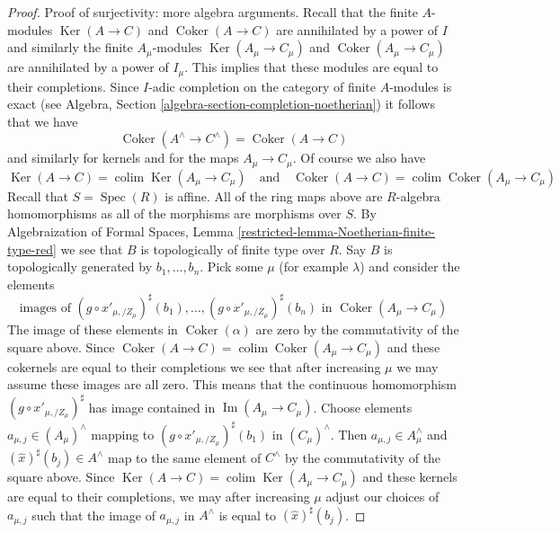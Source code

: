 \documentclass{stacks-project}
\theoremstyle{plain}
\theoremstyle{definition}
\theoremstyle{remark}
\numberwithin{equation}{subsection}
\def\colim{\mathop{\mathrm{colim}}\nolimits}
\def\Spec{\mathop{\mathrm{Spec}}}
\def\Ker{\mathop{\mathrm{Ker}}}
\def\Im{\mathop{\mathrm{Im}}}
\def\Coker{\mathop{\mathrm{Coker}}}
\begin{document}
\begin{proof}
\medskip\noindent
Proof of surjectivity: more algebra arguments. Recall that the finite
$A$-modules $\Ker(A \to C)$ and $\Coker(A \to C)$ are annihilated
by a power of $I$ and similarly the finite $A_\mu$-modules
$\Ker(A_\mu \to C_\mu)$ and $\Coker(A_\mu \to C_\mu)$ are annihilated
by a power of $I_\mu$. This implies that these modules are
equal to their completions. Since $I$-adic completion on the category of
finite $A$-modules is exact (see
Algebra, Section \ref{algebra-section-completion-noetherian})
it follows that we have
$$
\Coker(A^\wedge \to C^\wedge) = \Coker(A \to C)
$$
and similarly for kernels and for the maps $A_\mu \to C_\mu$.
Of course we also have
$$
\Ker(A \to C) = \colim \Ker(A_\mu \to C_\mu)
\quad\text{and}\quad
\Coker(A \to C) = \colim \Coker(A_\mu \to C_\mu)
$$
Recall that $S = \Spec(R)$ is affine. All of the ring maps
above are $R$-algebra homomorphisms as all of the morphisms
are morphisms over $S$. By
Algebraization of Formal Spaces, Lemma
\ref{restricted-lemma-Noetherian-finite-type-red}
we see that $B$ is topologically of finite type over $R$.
Say $B$ is topologically generated by $b_1, \ldots, b_n$.
Pick some $\mu$ (for example $\lambda$) and consider
the elements
$$
\text{images of }
(g \circ x'_{\mu, /Z_\mu})^\sharp(b_1)
, \ldots,
(g \circ x'_{\mu, /Z_\mu})^\sharp(b_n)
\text{ in }\Coker(A_\mu \to C_\mu)
$$
The image of these elements in $\Coker(\alpha)$ are zero
by the commutativity of the square above. Since
$\Coker(A \to C) = \colim \Coker(A_\mu \to C_\mu)$ and these
cokernels are equal to their completions
we see that after increasing $\mu$ we may assume these
images are all zero. This means that the continuous
homomorphism $(g \circ x'_{\mu, /Z_\mu})^\sharp$ has image contained
in $\Im(A_\mu \to C_\mu)$.
Choose elements $a_{\mu, j} \in (A_\mu)^\wedge$ mapping to
$(g \circ x'_{\mu, /Z_\mu})^\sharp(b_1)$ in $(C_\mu)^\wedge$.
Then $a_{\mu, j} \in A_\mu^\wedge$ and $(\hat x)^\sharp(b_j) \in A^\wedge$
map to the same element of $C^\wedge$ by the commutativity of the
square above. Since
$\Ker(A \to C) = \colim \Ker(A_\mu \to C_\mu)$ and these kernels
are equal to their completions, we may after increasing
$\mu$ adjust our choices of $a_{\mu, j}$ such that
the image of $a_{\mu, j}$ in $A^\wedge$ is equal to $(\hat x)^\sharp(b_j)$.


\end{proof}
\end{document}
